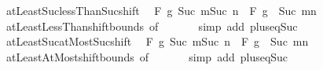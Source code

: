 \begin{isabellebody}
{\isafoldproof}%
%
\isadelimproof
\isanewline
%
\endisadelimproof
\isanewline
{}\isamarkupfalse%
\ atLeast{\isacharunderscore}{\kern0pt}Suc{\isacharunderscore}{\kern0pt}lessThan{\isacharunderscore}{\kern0pt}Suc{\isacharunderscore}{\kern0pt}shift{\isacharcolon}{\kern0pt}\isanewline
\ \ {\isachardoublequoteopen}F\ g\ {\isacharbraceleft}{\kern0pt}Suc\ m{\isachardot}{\kern0pt}{\isachardot}{\kern0pt}{\isacharless}{\kern0pt}Suc\ n{\isacharbraceright}{\kern0pt}\ {\isacharequal}{\kern0pt}\ F\ {\isacharparenleft}{\kern0pt}g\ {\isasymcirc}\ Suc{\isacharparenright}{\kern0pt}\ {\isacharbraceleft}{\kern0pt}m{\isachardot}{\kern0pt}{\isachardot}{\kern0pt}{\isacharless}{\kern0pt}n{\isacharbraceright}{\kern0pt}{\isachardoublequoteclose}\isanewline
%
\isadelimproof
\ \ %
\endisadelimproof
%
\isatagproof
{}\isamarkupfalse%
\ atLeastLessThan{\isacharunderscore}{\kern0pt}shift{\isacharunderscore}{\kern0pt}bounds\ {\isacharbrackleft}{\kern0pt}of\ {\isacharunderscore}{\kern0pt}\ {\isacharunderscore}{\kern0pt}\ {}{\isacharbrackright}{\kern0pt}\isanewline
\ \ \isamarkupfalse%
\ {\isacharparenleft}{\kern0pt}simp\ add{\isacharcolon}{\kern0pt}\ plus{\isacharunderscore}{\kern0pt}{}{\isacharunderscore}{\kern0pt}eq{\isacharunderscore}{\kern0pt}Suc{\isacharparenright}{\kern0pt}%
\endisatagproof
{\isafoldproof}%
%
\isadelimproof
\isanewline
%
\endisadelimproof
\isanewline
{}\isamarkupfalse%
\ atLeast{\isacharunderscore}{\kern0pt}Suc{\isacharunderscore}{\kern0pt}atMost{\isacharunderscore}{\kern0pt}Suc{\isacharunderscore}{\kern0pt}shift{\isacharcolon}{\kern0pt}\isanewline
\ \ {\isachardoublequoteopen}F\ g\ {\isacharbraceleft}{\kern0pt}Suc\ m{\isachardot}{\kern0pt}{\isachardot}{\kern0pt}Suc\ n{\isacharbraceright}{\kern0pt}\ {\isacharequal}{\kern0pt}\ F\ {\isacharparenleft}{\kern0pt}g\ {\isasymcirc}\ Suc{\isacharparenright}{\kern0pt}\ {\isacharbraceleft}{\kern0pt}m{\isachardot}{\kern0pt}{\isachardot}{\kern0pt}n{\isacharbraceright}{\kern0pt}{\isachardoublequoteclose}\isanewline
%
\isadelimproof
\ \ %
\endisadelimproof
%
\isatagproof
{}\isamarkupfalse%
\ atLeastAtMost{\isacharunderscore}{\kern0pt}shift{\isacharunderscore}{\kern0pt}bounds\ {\isacharbrackleft}{\kern0pt}of\ {\isacharunderscore}{\kern0pt}\ {\isacharunderscore}{\kern0pt}\ {}{\isacharbrackright}{\kern0pt}\isanewline
\ \ \isamarkupfalse%
\ {\isacharparenleft}{\kern0pt}simp\ add{\isacharcolon}{\kern0pt}\ plus{\isacharunderscore}{\kern0pt}{}{\isacharunderscore}{\kern0pt}eq{\isacharunderscore}{\kern0pt}Suc{\isacharparenright}{\kern0pt}%

\end{isabellebody}
